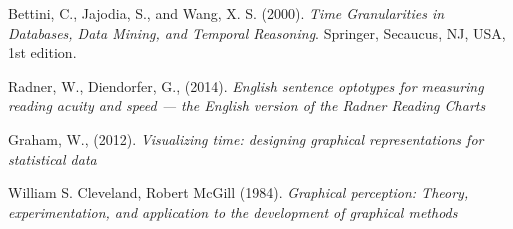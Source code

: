 \documentclass[12pt]{article}
\begin{document}
\begin{thebibliography}{1}
   Bettini, C., Jajodia, S., and Wang, X. S. (2000). {\em Time Granularities in Databases, Data Mining, and Temporal Reasoning}. Springer, Secaucus, NJ, USA, 1st edition.

   Radner, W., Diendorfer, G., (2014). {\em English sentence optotypes for measuring reading acuity and speed --- the English version of the Radner Reading Charts}

   Graham, W., (2012). {\em Visualizing time: designing graphical representations for statistical data}

   William S. Cleveland, Robert McGill (1984). {\em Graphical perception: Theory, experimentation, and application to the development of graphical methods}
    
  
  \end{thebibliography}
 
\end{document}
